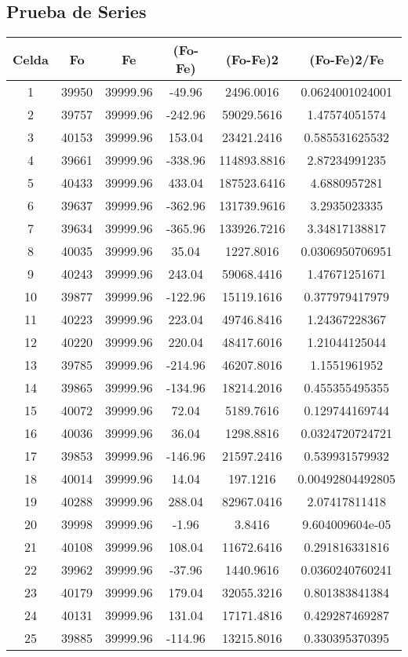 \documentclass{article}
\begin{document}
\subsection{Prueba de Series}
\begin{tabular}{|c|c|c|c|c|c|}
Celda&Fo&Fe&(Fo{-}Fe)&(Fo{-}Fe)2&(Fo{-}Fe)2/Fe\\
\hline
1&39950&39999.96&{-}49.96&2496.0016&0.0624001024001\\
\hline
2&39757&39999.96&{-}242.96&59029.5616&1.47574051574\\
\hline
3&40153&39999.96&153.04&23421.2416&0.585531625532\\
\hline
4&39661&39999.96&{-}338.96&114893.8816&2.87234991235\\
\hline
5&40433&39999.96&433.04&187523.6416&4.6880957281\\
\hline
6&39637&39999.96&{-}362.96&131739.9616&3.2935023335\\
\hline
7&39634&39999.96&{-}365.96&133926.7216&3.34817138817\\
\hline
8&40035&39999.96&35.04&1227.8016&0.0306950706951\\
\hline
9&40243&39999.96&243.04&59068.4416&1.47671251671\\
\hline
10&39877&39999.96&{-}122.96&15119.1616&0.377979417979\\
\hline
11&40223&39999.96&223.04&49746.8416&1.24367228367\\
\hline
12&40220&39999.96&220.04&48417.6016&1.21044125044\\
\hline
13&39785&39999.96&{-}214.96&46207.8016&1.1551961952\\
\hline
14&39865&39999.96&{-}134.96&18214.2016&0.455355495355\\
\hline
15&40072&39999.96&72.04&5189.7616&0.129744169744\\
\hline
16&40036&39999.96&36.04&1298.8816&0.0324720724721\\
\hline
17&39853&39999.96&{-}146.96&21597.2416&0.539931579932\\
\hline
18&40014&39999.96&14.04&197.1216&0.00492804492805\\
\hline
19&40288&39999.96&288.04&82967.0416&2.07417811418\\
\hline
20&39998&39999.96&{-}1.96&3.8416&9.604009604e{-}05\\
\hline
21&40108&39999.96&108.04&11672.6416&0.291816331816\\
\hline
22&39962&39999.96&{-}37.96&1440.9616&0.0360240760241\\
\hline
23&40179&39999.96&179.04&32055.3216&0.801383841384\\
\hline
24&40131&39999.96&131.04&17171.4816&0.429287469287\\
\hline
25&39885&39999.96&{-}114.96&13215.8016&0.330395370395\\
\end{tabular}
\end{document}
